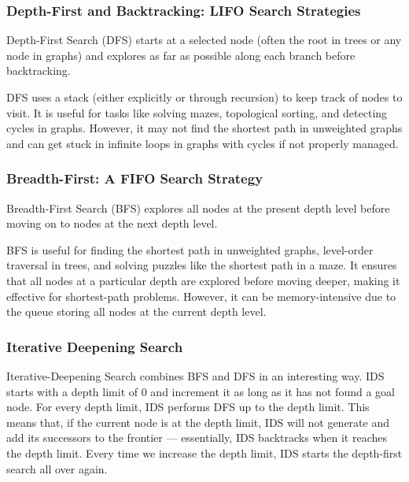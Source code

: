                 \subsubsection{Depth-First and Backtracking: LIFO Search Strategies}

                    Depth-First Search (DFS) starts at a selected node (often the root in trees or any node in graphs) and explores as far as possible along each branch before backtracking. 

                    DFS uses a stack (either explicitly or through recursion) to keep track of nodes to visit. It is useful for tasks like solving mazes, topological sorting, and detecting cycles in graphs. However, it may not find the shortest path in unweighted graphs and can get stuck in infinite loops in graphs with cycles if not properly managed.

                \subsubsection{Breadth-First: A FIFO Search Strategy}

                    Breadth-First Search (BFS) explores all nodes at the present depth level before moving on to nodes at the next depth level.

                    BFS is useful for finding the shortest path in unweighted graphs, level-order traversal in trees, and solving puzzles like the shortest path in a maze. It ensures that all nodes at a particular depth are explored before moving deeper, making it effective for shortest-path problems. However, it can be memory-intensive due to the queue storing all nodes at the current depth level.

                \subsubsection{Iterative Deepening Search}
                
                    Iterative-Deepening Search combines BFS and DFS in an interesting way. IDS starts with a depth limit of 0 and increment it as long as it has not found a goal node. For every depth limit, IDS performs DFS up to the depth limit. This means that, if the current node is at the depth limit, IDS will not generate and add its successors to the frontier — essentially, IDS backtracks when it reaches the depth limit. Every time we increase the depth limit, IDS starts the depth-first search all over again.


